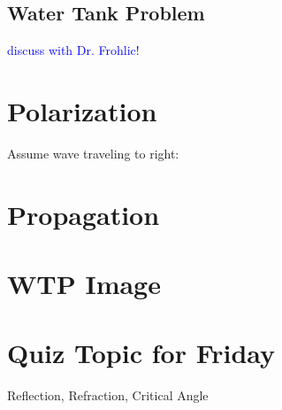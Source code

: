 \documentclass[twocolumn,draft]{article}
\newcommand{\bt}[1]{\textcolor{blue}{#1}}
\begin{document}
\subsection*{Water Tank Problem}
\bt{discuss with Dr. Frohlic!}

\section*{Polarization}
Assume wave traveling to right:

\section*{Propagation}

\section*{WTP Image}

\section*{Quiz Topic for Friday}
Reflection, Refraction, Critical Angle





  
\end{document}
